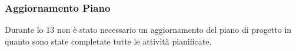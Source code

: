 \subsubsection{Aggiornamento Piano}
\label{sec:aggiornamento_piano_sprint13}
Durante lo  13 non è stato necessario un aggiornamento del piano di progetto in quanto sono state completate tutte le attività pianificate. 